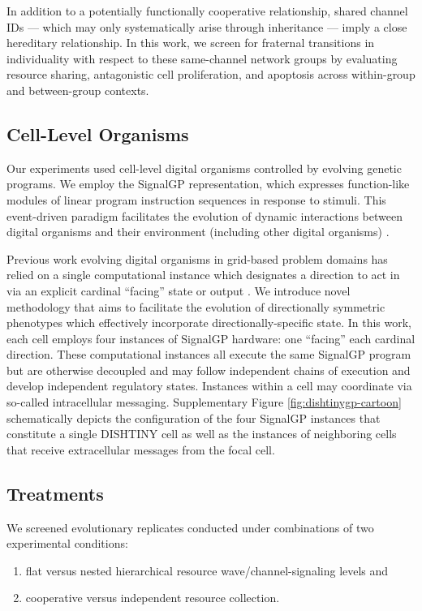 In addition to a potentially functionally cooperative relationship, shared channel IDs --- which may only systematically arise through inheritance --- imply a close hereditary relationship.
In this work, we screen for fraternal transitions in individuality with respect to these same-channel network groups by evaluating resource sharing, antagonistic cell proliferation, and apoptosis across within-group and between-group contexts.

\subsection{Cell-Level Organisms}

Our experiments used cell-level digital organisms controlled by evolving
genetic programs.
We employ the SignalGP representation, which expresses function-like modules of linear program instruction sequences in response to stimuli.
This event-driven paradigm facilitates the evolution of dynamic interactions between digital organisms and their environment (including other digital organisms) \cite{lalejini2018evolving}.

Previous work evolving digital organisms in grid-based problem domains has relied on a single computational instance which designates a direction to act in via an explicit cardinal ``facing'' state or output \cite{goldsby2014evolutionary, goldsby2018serendipitous, grabowski2010early, biswas2014causes, lalejini2018evolving}.
We introduce novel methodology that aims to facilitate the evolution of directionally symmetric phenotypes which effectively incorporate directionally-specific state.
In this work, each cell employs four instances of SignalGP hardware: one ``facing'' each cardinal direction.
These computational instances all execute the same SignalGP program but are otherwise decoupled and may follow independent chains of execution and develop independent regulatory states.
Instances within a cell may coordinate via so-called intracellular messaging.
Supplementary Figure \ref{fig:dishtinygp-cartoon} schematically depicts the configuration of the four SignalGP instances that constitute a single DISHTINY cell as well as the instances of neighboring cells that receive extracellular messages from the focal cell.

\subsection{Treatments}

We screened evolutionary replicates conducted under combinations of two experimental conditions:
\begin{enumerate}
\item flat versus nested hierarchical resource wave/channel-signaling levels and
\item cooperative versus independent resource collection.
\end{enumerate}

